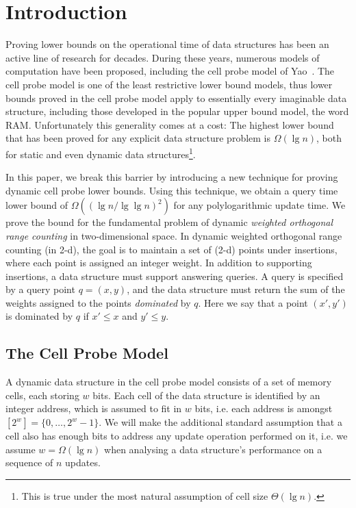 \documentclass[letterpaper]{article}
\begin{document}
\newpage

\section{Introduction}
Proving lower bounds on the operational time of data structures has
been an active line of research for decades. During these years,
numerous models of computation have been proposed, including the cell
probe model of Yao~\cite{yao:cellprobe}. The cell probe model is one
of the least restrictive lower bound models, thus lower bounds proved
in the cell probe model apply to essentially every imaginable data
structure, including those developed in the popular upper bound model,
the word RAM. Unfortunately this generality comes at a cost: The
highest lower bound that has been proved for any explicit data
structure problem is $\Omega(\lg n)$, both for static and even dynamic
data structures\footnote{This is true under the most natural
  assumption of cell size $\Theta(\lg n)$.}.

In this paper, we break this barrier by introducing a new technique
for proving dynamic cell probe lower bounds. Using this technique, we
obtain a query time lower bound of $\Omega((\lg n/\lg \lg n)^2)$ for
any polylogarithmic update time. We prove the bound for the
fundamental problem of dynamic \emph{weighted orthogonal range
  counting} in two-dimensional space. In dynamic weighted orthogonal
range counting (in 2-d), the goal is to maintain a set of (2-d) points
under insertions, where each point is assigned an integer weight. In
addition to supporting insertions, a data structure must support
answering queries. A query is specified by a query point $q=(x,y)$,
and the data structure must return the sum of the weights assigned to
the points \emph{dominated} by $q$. Here we say that a point
$(x',y')$ is dominated by $q$ if $x' \leq x$ and $y' \leq y$.

\subsection{The Cell Probe Model}
A dynamic data structure in the cell probe model consists of a set of
memory cells, each storing $w$ bits. Each cell of the data structure
is identified by an integer address, which is assumed to fit in $w$
bits, i.e. each address is amongst $[2^w]=\{0,\dots,2^w-1\}$. We will
make the additional standard assumption that a cell also has enough
bits to address any update operation performed on it, i.e. we assume
$w = \Omega(\lg n)$ when analysing a data structure's performance on a
sequence of $n$ updates.
\end{document}
